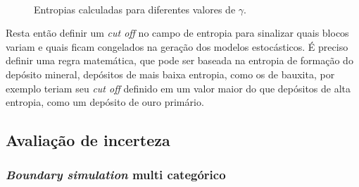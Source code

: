 \begin{figure}[t]
\caption{Entropias calculadas para diferentes valores de $\gamma$.} 
\label{entro_gamma}
\begin{center}
\\
\end{center}
\begin{center}
\end{center}
\end{figure}

Resta então definir um \textit{cut off} no campo de entropia para sinalizar quais blocos variam e quais ficam congelados na geração dos modelos estocásticos. É preciso definir uma regra matemática, que pode ser baseada na entropia de formação do depósito mineral, depósitos de mais baixa entropia, como os de bauxita, por exemplo teriam seu \textit{cut off} definido em um valor maior do que depósitos de alta entropia, como um depósito de ouro primário.

\subsection{Avaliação de incerteza}

\subsubsection{\textit{Boundary simulation} multi categórico}

